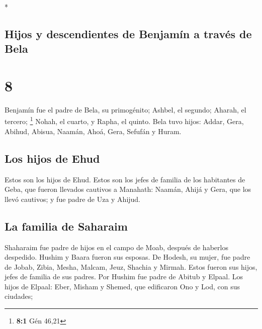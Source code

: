 \begin{paracol}{2}
\begin{otherlanguage}{english}
\end{otherlanguage}

\switchcolumn[0]*

\hypertarget{hijos-y-descendientes-de-benjamuxedn-a-travuxe9s-de-bela}{%
\subsection{Hijos y descendientes de Benjamín a través de
Bela}\label{hijos-y-descendientes-de-benjamuxedn-a-travuxe9s-de-bela}}

\hypertarget{section-14}{%
\section{8}\label{section-14}}

 Benjamín fue el padre de Bela, su primogénito; Ashbel, el
segundo; Aharah, el tercero; \footnote{\textbf{8:1} Gén 46,21}
 Nohah, el cuarto, y Rapha, el quinto.  Bela
tuvo hijos: Addar, Gera, Abihud,  Abisua, Naamán, Ahoá,
 Gera, Sefufán y Huram.

\hypertarget{los-hijos-de-ehud}{%
\subsection{Los hijos de Ehud}\label{los-hijos-de-ehud}}

 Estos son los hijos de Ehud. Estos son los jefes de
familia de los habitantes de Geba, que fueron llevados cautivos a
Manahath:  Naamán, Ahijá y Gera, que los llevó cautivos; y
fue padre de Uza y Ahijud.

\hypertarget{la-familia-de-saharaim}{%
\subsection{La familia de Saharaim}\label{la-familia-de-saharaim}}

 Shaharaim fue padre de hijos en el campo de Moab, después
de haberlos despedido. Hushim y Baara fueron sus esposas. 
De Hodesh, su mujer, fue padre de Jobab, Zibia, Mesha, Malcam,
 Jeuz, Shachia y Mirmah. Estos fueron sus hijos, jefes de
familia de sus padres.  Por Hushim fue padre de Abitub y
Elpaal.  Los hijos de Elpaal: Eber, Misham y Shemed, que
edificaron Ono y Lod, con sus ciudades;

\hypertarget{cinco-familias-benjaminitas-en-ajaluxf3n-y-jerusaluxe9n}{%
}
\end{paracol}
